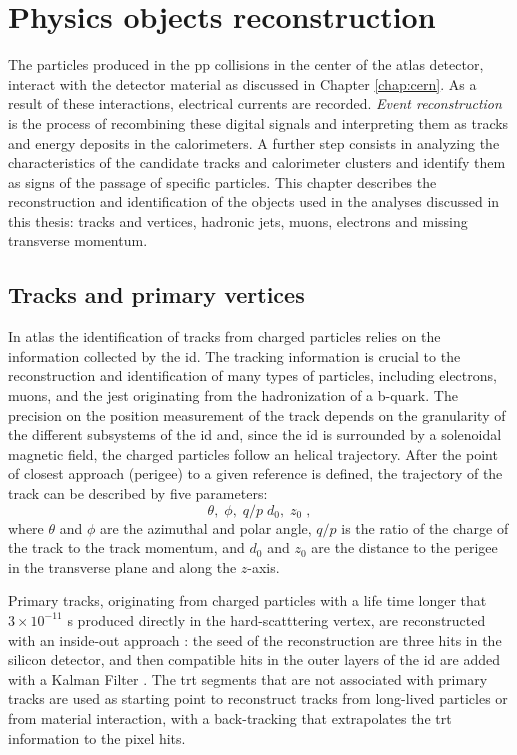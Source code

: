 \chapter{Physics objects reconstruction}
\label{sec:event:reco}

The particles produced in the \gls{pp} collisions in the center of the \gls{atlas} detector, interact with the detector material as discussed in Chapter \ref{chap:cern}. As a result of these interactions, electrical currents are recorded. \textit{Event reconstruction} is the process of recombining these digital signals and interpreting them as tracks and energy deposits in the calorimeters. A further step consists in analyzing the characteristics of the candidate tracks and calorimeter clusters and identify them as signs of the passage of specific particles.
This chapter describes the reconstruction and identification of the objects used in the analyses discussed in this thesis: tracks and vertices, hadronic jets, muons, electrons and missing transverse momentum. 


\section{Tracks and primary vertices}
\label{sec:reco:tracks}

In \gls{atlas} the identification of tracks from charged particles relies on the information collected by the \gls{id}. The tracking information is crucial to the reconstruction and identification of many types of particles, including electrons, muons, and the jest originating from the hadronization of a b-quark. The precision on the position measurement of the track depends on the granularity of the different subsystems of the \gls{id} and, since the \gls{id} is surrounded by a solenoidal magnetic field, the charged particles follow an helical trajectory. After the point of closest approach (perigee) to a given reference is defined, the trajectory of the track can be described by five parameters: 
\begin{equation}
\theta, \; \phi, \; q/p \; d_0, \; z_0 \;,
\end{equation}
\noindent where $\theta$ and $\phi$ are the azimuthal and polar angle, $q/p$ is the ratio of the charge of the track to the track momentum, and $d_0$ and $z_0$ are the distance to the perigee in the transverse plane and along the $z$-axis. 

Primary tracks, originating from charged particles with a life time longer that $3 \times 10^{-11}$ s produced directly in the hard-scatttering vertex, are reconstructed with an inside-out approach \cite{Cornelissen:1020106}: the seed of the reconstruction are three hits in the silicon detector, and then compatible hits in the outer layers of the \gls{id} are added with a Kalman Filter \cite{citeulike:347166,Fruhwirth:1987fm}. The \gls{trt} segments that are not associated with primary tracks are used as starting point to reconstruct tracks from long-lived particles or from material interaction, with a back-tracking that extrapolates the \gls{trt} information to the pixel hits. 

